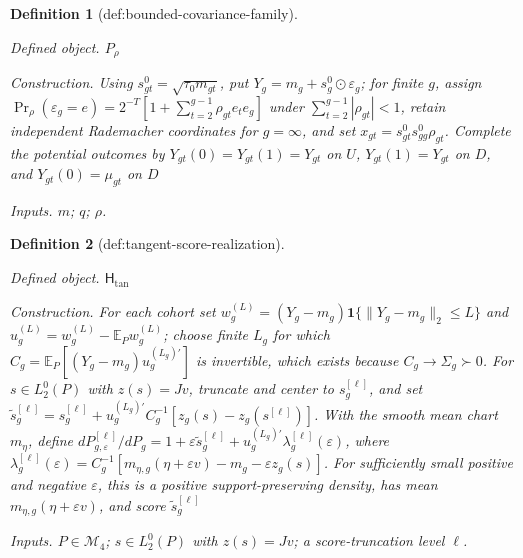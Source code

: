 \documentclass{article}
\newtheorem{definition}{Definition}
\begin{document}
\begin{definition}[def:bounded-covariance-family]\label{def:bounded-covariance-family}
\par\smallskip\noindent\emph{Defined object.} \(P_{\rho}\)
\par\smallskip\noindent\emph{Construction.} Using \(s^0_{gt}=\sqrt{\tau_0m_{gt}}\), put \(Y_g=m_g+s_g^0\odot\varepsilon_g\); for finite \(g\), assign \(\Pr_{\rho}(\varepsilon_g=e)=2^{-T}[1+\sum_{t=2}^{g-1}\rho_{gt}e_te_g]\) under \(\sum_{t=2}^{g-1}|\rho_{gt}|<1\), retain independent Rademacher coordinates for \(g=\infty\), and set \(x_{gt}=s^0_{gt}s^0_{gg}\rho_{gt}\). Complete the potential outcomes by \(Y_{gt}(0)=Y_{gt}(1)=Y_{gt}\) on \(U\), \(Y_{gt}(1)=Y_{gt}\) on \(D\), and \(Y_{gt}(0)=\mu_{gt}\) on \(D\)
\par\smallskip\noindent\emph{Inputs.} \(m\); \(q\); \(\rho\).
\end{definition}

\begin{definition}[def:tangent-score-realization]\label{def:tangent-score-realization}
\par\smallskip\noindent\emph{Defined object.} \(\mathsf H_{\mathrm{tan}}\)
\par\smallskip\noindent\emph{Construction.} For each cohort set \(w_g^{(L)}=(Y_g-m_g)\mathbf 1\{\|Y_g-m_g\|_2\le L\}\) and \(u_g^{(L)}=w_g^{(L)}-\mathbb E_Pw_g^{(L)}\); choose finite \(L_g\) for which \(C_g=\mathbb E_P[(Y_g-m_g)u_g^{(L_g)\prime}]\) is invertible, which exists because \(C_g\to\Sigma_g\succ0\). For \(s\in L_2^0(P)\) with \(z(s)=Jv\), truncate and center to \(s_g^{[\ell]}\), and set \(\widetilde s_g^{[\ell]}=s_g^{[\ell]}+u_g^{(L_g)\prime}C_g^{-1}[z_g(s)-z_g(s^{[\ell]})]\). With the smooth mean chart \(m_{\eta}\), define \(dP_{g,\varepsilon}^{[\ell]}/dP_g=1+\varepsilon\widetilde s_g^{[\ell]}+u_g^{(L_g)\prime}\lambda_g^{[\ell]}(\varepsilon)\), where \(\lambda_g^{[\ell]}(\varepsilon)=C_g^{-1}[m_{\eta,g}(\eta+\varepsilon v)-m_g-\varepsilon z_g(s)]\). For sufficiently small positive and negative \(\varepsilon\), this is a positive support-preserving density, has mean \(m_{\eta,g}(\eta+\varepsilon v)\), and score \(\widetilde s_g^{[\ell]}\)
\par\smallskip\noindent\emph{Inputs.} \(P\in\mathcal M_4\); \(s\in L_2^0(P)\) with \(z(s)=Jv\); a score-truncation level \(\ell\).
\end{definition}
\end{document}
